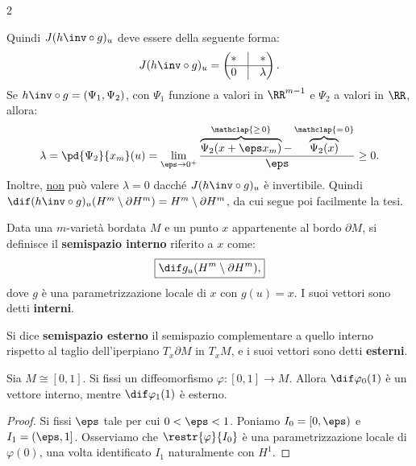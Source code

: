 \begin{multicols*}{2}
\begin{remark}
        Quindi $J(h\inv \circ g)_u$ deve essere della seguente forma:
        \[
            J(h\inv \circ g)_u = \begin{pmatrix}
                * & \vline & *       \\
                \hline
                0 & \vline & \lambda
            \end{pmatrix}.
        \]
        Se $h\inv \circ g = (\Psi_1, \Psi_2)$, con $\Psi_1$ funzione a valori in $\RR^{m-1}$ e
        $\Psi_2$ a valori in $\RR$, allora:
        \[
            \lambda = \pd{\Psi_2}{x_m}(u) = \lim_{\eps \to 0^+} \frac{\overbrace{\Psi_2(x + \eps x_m)}^{\mathclap{\geq \, 0}} - \overbrace{\Psi_2(x)}^{\mathclap{= \, 0}}}{\eps} \geq 0.
        \]
        Inoltre, \underline{non} può valere $\lambda = 0$ dacché $J(h\inv \circ g)_u$ è invertibile.
        Quindi $\dif (h\inv \circ g)_u(H^m \setminus \partial H^m) = H^m \setminus \partial H^m$, da cui segue poi facilmente la tesi.
    \end{remark}

    \begin{definition}
        Data una $m$-varietà bordata $M$ e un punto $x$ appartenente al bordo
        $\partial M$, si definisce il \textbf{semispazio interno} riferito a
        $x$ come:
        \[
            \boxed{\dif g_u(H^m \setminus \partial H^m),}
        \]
        dove $g$ è una parametrizzazione locale di $x$ con $g(u) = x$. I suoi
        vettori sono detti \textbf{interni}. \smallskip

        Si dice \textbf{semispazio esterno} il semispazio complementare a quello
        interno rispetto al taglio dell'iperpiano $T_x \partial M$ in
        $T_x M$, e i suoi vettori sono detti \textbf{esterni}.
    \end{definition}

    \begin{lemma} \label{lem:0_interno_1_esterno}
        Sia $M \cong [0, 1]$. Si fissi un diffeomorfismo
        $\varphi : [0, 1] \to M$. Allora
        $\dif \varphi_0(1)$ è un vettore interno,
        mentre $\dif \varphi_1(1)$ è esterno.
    \end{lemma}

    \begin{proof}
        Si fissi $\eps$ tale per cui $0 < \eps < 1$. Poniamo
        $I_0 = [0, \eps)$ e $I_1 = (\eps, 1]$.
        Osserviamo che $\restr{\varphi}{I_0}$ è una
        parametrizzazione locale di $\varphi(0)$, una
        volta identificato $I_1$ naturalmente con $H^1$.


\end{proof}
\end{multicols*}
